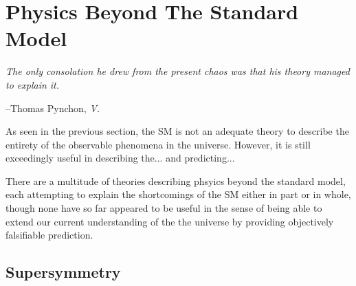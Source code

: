 \chapter{Physics Beyond The Standard Model}
\label{chap:bsm}

\epigraph{\textit{The only consolation he drew from the present chaos was that his theory managed to explain it.}}{--Thomas Pynchon, \textit{V.}}

As seen in the previous section, the SM is not an adequate theory to describe the entirety of the
observable phenomena in the universe. However, it is still exceedingly useful in describing
the... and predicting...

There are a multitude of theories describing phsyics beyond the standard model, each attempting to
explain the shortcomings of the SM either in part or in whole, though none have so far appeared to be
useful in the sense of being able to extend our current understanding of the the universe by providing
objectively falsifiable prediction.

\section{Supersymmetry}
